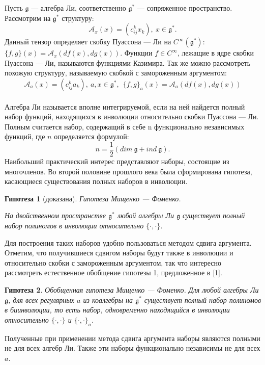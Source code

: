 


\newtheorem{conjecture}{Гипотеза}



\vzmscaption


Пусть $\mathfrak{g}$ --- алгебра Ли, соответственно ${\mathfrak{g}}^*$ --- сопряженное пространство. Рассмотрим на ${\mathfrak{g}^*}$ структуру:
$$
\mathcal{A}_x(x)=(c_{ij}^{k}x_k), \ x\in \mathfrak{g}^*.
$$
Данный тензор определяет скобку Пуассона --- Ли на $C^{\infty}(\mathfrak{g}^*)$: $
\{f,g\}(x)=\mathcal{A}_{x}(df(x),dg(x))
$. Функции $f\in C^{\infty}$, лежащие в ядре скобки Пуассона --- Ли, называются функциями Казимира.
Так же можно рассмотреть похожую структуру, называемую скобкой с замороженным аргументом:
$$
\mathcal{A}_a(x)=(c_{ij}^{k}a_k), \ a, x\in \mathfrak{g}^*, \ \ \{f,g\}_a(x)=\mathcal{A}_{a}(df(x),dg(x))
$$
\\
Алгебра Ли называется вполне интегрируемой, если на ней найдется полный набор функций, находящихся в инволюции относительно скобки Пуассона ---  Ли. Полным считается набор, содержащий в себе n функционально независимых функций, где $n$ определяется формулой:
$$
n = \frac1 2 (dim\ \mathfrak{g}+ind\ \mathfrak{g}).
$$
Наибольший практический интерес представляют наборы, состоящие из многочленов. Во второй половине прошлого века была сформирована гипотеза, касающиеся существования полных наборов в инволюции.
\begin{conjecture}[доказана]{Гипотеза Мищенко --- Фоменко.} 
 
На двойственном пространстве $\mathfrak{g}^*$ любой алгебры Ли $\mathfrak{g}$ существует полный набор полиномов в инволюции относительно $\{\cdot,\cdot\}$.
\end{conjecture}
Для построения таких наборов удобно пользоваться методом сдвига аргумента.
    Отметим, что получившиеся сдвигом наборы будут также в инволюции и относительно скобки с замороженным аргументом, так что интересно рассмотреть естественное обобщение гипотезы 1, предложенное в [1].
    \begin{conjecture}
    {Обобщенная гипотеза Мищенко --- Фоменко.} Для любой алгебры Ли $\mathfrak{g}$, для всех регулярных $a$ из коалгебры на $\mathfrak{g}^*$  существует полный набор полиномов в биинволюции, то есть набор, одновременно находящийся в инволюции относительно $\{\cdot,\cdot\}$  и $\{\cdot,\cdot\}_a$.
    \end{conjecture}
   Полученные при применении метода сдвига аргумента наборы являются полными не для всех алгебр Ли. Также эти наборы функционально независимы не для всех $a$.
     
